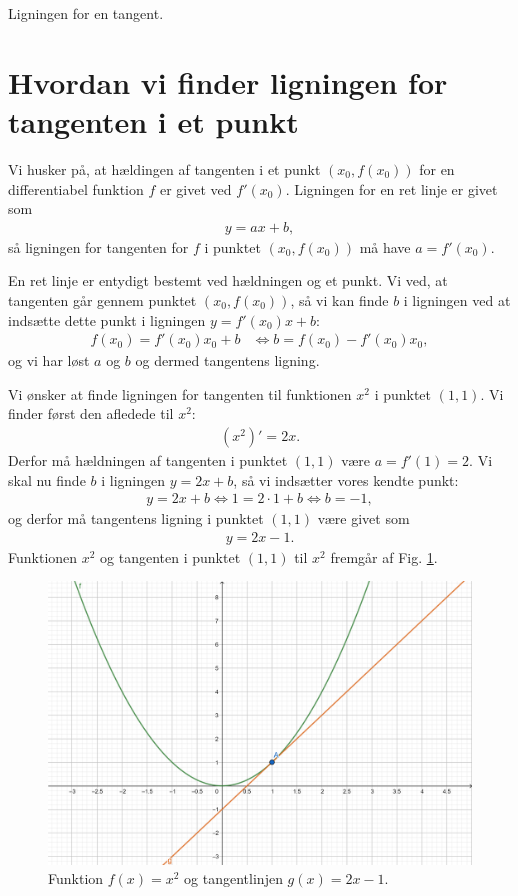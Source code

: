 
\begin{center}
\Huge
Ligningen for en tangent.
\end{center}
\section*{Hvordan vi finder ligningen for tangenten i et punkt}
Vi husker på, at hældingen af tangenten i et punkt $(x_0,f(x_0))$ for en differentiabel funktion $f$ er givet ved $f'(x_0)$. Ligningen for en ret linje er givet som 
\begin{align*}
y = ax+b,
\end{align*}
så ligningen for tangenten for $f$ i punktet $(x_0,f(x_0))$ må have $a = f'(x_0)$. 

En ret linje er entydigt bestemt ved hældningen og et punkt. Vi ved, at tangenten går gennem punktet $(x_0,f(x_0))$, så vi kan finde $b$ i ligningen ved at indsætte dette punkt i ligningen $y = f'(x_0)x+b$:
\begin{align*}
f(x_0) = f'(x_0)x_0+b &\Leftrightarrow b = f(x_0)-f'(x_0)x_0,
\end{align*}
og vi har løst $a$ og $b$ og dermed tangentens ligning.
\begin{exa}
Vi ønsker at finde ligningen for tangenten til funktionen $x^2$ i punktet $(1,1)$. Vi finder først den afledede til $x^2$:
\begin{align*}
(x^2)' = 2x.
\end{align*}
Derfor må hældningen af tangenten i punktet $(1,1)$ være $a = f'(1) = 2$. Vi skal nu finde $b$ i ligningen $y=2x+b$, så vi indsætter vores kendte punkt:
\begin{align*}
y = 2x+b \Leftrightarrow 1= 2\cdot 1 +b \Leftrightarrow b = -1,
\end{align*}
og derfor må tangentens ligning i punktet $(1,1)$ være givet som
\begin{align*}
y = 2x-1.
\end{align*}
Funktionen $x^2$ og tangenten i punktet $(1,1)$ til $x^2$ fremgår af Fig. \ref{fig:tangent}.
\begin{figure}[H]
\centering
\includegraphics[scale=0.9]{Billeder/tangenthaeld.png}
\caption{Funktion $f(x)=x^2$ og tangentlinjen $g(x) = 2x-1$.}
\label{fig:tangent}
\end{figure} 
\end{exa}
